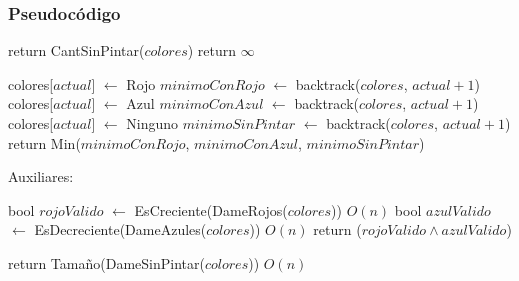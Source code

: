 \subsubsection{Pseudocódigo}

\begin{algorithm}
\begin{algorithmic}


    \State return CantSinPintar($colores$)
  \Else
    \State return $\infty$ 
  \EndIf

\Else

  \State colores[$actual$] $\gets$ Rojo 
  \State $minimoConRojo$ $\gets$ backtrack($colores$, $actual + 1$) \\

  \State colores[$actual$] $\gets$ Azul 
  \State $minimoConAzul$ $\gets$ backtrack($colores$, $actual + 1$) \\

  \State colores[$actual$] $\gets$ Ninguno 
  \State $minimoSinPintar$ $\gets$ backtrack($colores$, $actual + 1$) \\

  \State return Min($minimoConRojo$, $minimoConAzul$, $minimoSinPintar$) 

\EndIf
\EndProcedure
\end{algorithmic}
\end{algorithm}


Auxiliares: 

\begin{algorithm}
\begin{algorithmic}

    \State bool $rojoValido$ $\gets$ EsCreciente(DameRojos($colores$))  \Comment $O(n)$
    \State bool $azulValido$ $\gets$ EsDecreciente(DameAzules($colores$)) \Comment $O(n)$
    \State return ($rojoValido \land azulValido$)

\EndProcedure
\end{algorithmic}
\end{algorithm}


\begin{algorithm}
\begin{algorithmic}
    \State return Tamaño(DameSinPintar($colores$))  \Comment $O(n)$
\EndProcedure
\end{algorithmic}
\end{algorithm}

